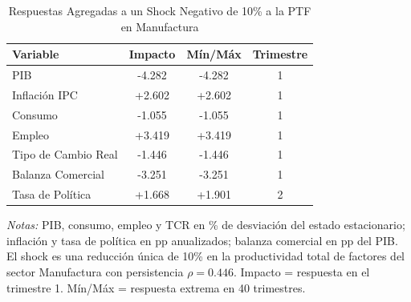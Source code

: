\begin{table}[htbp]
\centering
\caption{Respuestas Agregadas a un Shock Negativo de 10\% a la PTF en Manufactura}
\label{tab:mfg_agg}
\begin{threeparttable}
\begin{tabular}{@{}l c c c@{}}
\toprule
Variable & Impacto & Mín/Máx & Trimestre \\
\midrule
PIB & -4.282 & -4.282 & 1 \\
Inflación IPC & +2.602 & +2.602 & 1 \\
Consumo & -1.055 & -1.055 & 1 \\
Empleo & +3.419 & +3.419 & 1 \\
Tipo de Cambio Real & -1.446 & -1.446 & 1 \\
Balanza Comercial & -3.251 & -3.251 & 1 \\
Tasa de Política & +1.668 & +1.901 & 2 \\
\bottomrule
\end{tabular}
\begin{tablenotes}[flushleft]
\footnotesize
\item \textit{Notas:} PIB, consumo, empleo y TCR en \% de desviación del estado estacionario; inflación y tasa de política en pp anualizados; balanza comercial en pp del PIB. El shock es una reducción única de 10\% en la productividad total de factores del sector Manufactura con persistencia $\rho = 0.446$. Impacto = respuesta en el trimestre 1. Mín/Máx = respuesta extrema en 40 trimestres.
\end{tablenotes}
\end{threeparttable}
\end{table}
